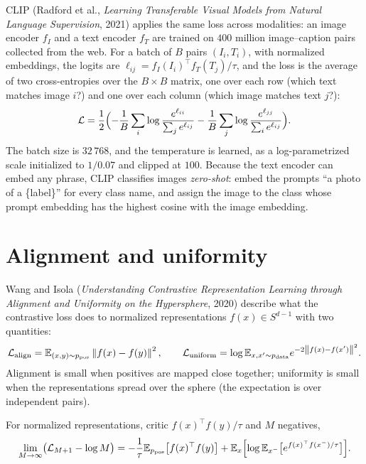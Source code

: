 \begin{notechapter}
CLIP (Radford et al., \emph{Learning Transferable Visual Models from Natural Language
Supervision}, 2021) applies the same loss across modalities: an image encoder $f_I$ and a text
encoder $f_T$ are trained on $400$ million image--caption pairs collected from the web. For a batch of $B$ pairs
$(I_i, T_i)$, with normalized embeddings, the logits are $\ell_{ij} = f_I(I_i)^\top f_T(T_j)/\tau$, and the loss is the average of two
cross-entropies over the $B\times B$ matrix, one over each row (which text matches image $i$?) and one over each
column (which image matches text $j$?):
\[
  \mathcal L = \frac12\Bigl(-\frac1B\sum_i\log\frac{e^{\ell_{ii}}}{\sum_je^{\ell_{ij}}} - \frac1B\sum_j\log\frac{e^{\ell_{jj}}}{\sum_ie^{\ell_{ij}}}\Bigr).
\]
The batch size is $32\,768$, and the temperature is learned, as a log-parametrized scale initialized to
$1/0.07$ and clipped at $100$. Because the text encoder can embed any phrase, CLIP classifies images
\emph{zero-shot}: embed the prompts ``a photo of a \{label\}'' for every class name, and assign the image to
the class whose prompt embedding has the highest cosine with the image embedding.

\section{Alignment and uniformity}\label{contrastive-practice:sec:alignment}

Wang and Isola (\emph{Understanding Contrastive Representation Learning through Alignment
and Uniformity on the Hypersphere}, 2020) describe what the contrastive loss does to normalized
representations $f(x)\in S^{d-1}$ with two quantities:
\[
  \mathcal L_{\mathrm{align}} = \mathbb{E}_{(x,y)\sim p_{\mathrm{pos}}}\left\|f(x) - f(y)\right\|^2,\qquad
  \mathcal L_{\mathrm{uniform}} = \log\mathbb{E}_{x,x'\sim p_{\mathrm{data}}}e^{-2\left\|f(x) - f(x')\right\|^2} .
\]
Alignment is small when positives are mapped close together; uniformity is small when the
representations spread over the sphere (the expectation is over independent pairs).

\begin{theorem}\label{contrastive-practice:thm:alignment}
For normalized representations, critic $f(x)^\top f(y)/\tau$ and $M$ negatives,
\[
  \lim_{M\to\infty}\bigl(\mathcal L_{M+1} - \log M\bigr) = -\frac1\tau\mathbb{E}_{p_{\mathrm{pos}}}\bigl[f(x)^\top f(y)\bigr] + \mathbb{E}_x\Bigl[\log\mathbb{E}_{x^-}\bigl[e^{f(x)^\top f(x^-)/\tau}\bigr]\Bigr].
\]
\end{theorem}


\end{notechapter}
